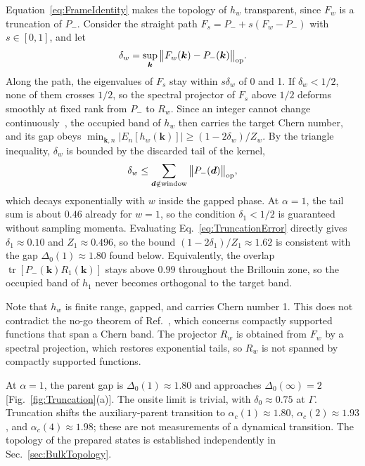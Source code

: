\documentclass[aps,prb,10pt,twocolumn,superscriptaddress,longbibliography,floatfix]{revtex4-2}
\newcommand{\bk}{\boldsymbol k}
\newcommand{\newtext}[1]{{\color{blue}#1}}
\begin{document}
{Equation~\eqref{eq:FrameIdentity} makes the topology of $h_w$ transparent, since $F_w$ is a truncation of $P_-$. Consider the straight path $F_s=P_-+s(F_w-P_-)$ with $s\in[0,1]$, and let
\begin{equation}
    \delta_w=\sup_{\bk}\big\|F_w(\bk)-P_-(\bk)\big\|_{\rm op}.
    \label{eq:TruncationError}
\end{equation}
Along the path, the eigenvalues of $F_s$ stay within $s\delta_w$ of 0 and 1. If $\delta_w<1/2$, none of them crosses $1/2$, so the spectral projector of $F_s$ above $1/2$ deforms smoothly at fixed rank from $P_-$ to $R_w$. Since an integer cannot change continuously~\cite{AvronSeilerSimon1983}, the occupied band of $h_w$ then carries the target Chern number, and its gap obeys $\min_{\bk,n}|E_n[h_w(\bk)]|\geq(1-2\delta_w)/Z_w$. By the triangle inequality, $\delta_w$ is bounded by the discarded tail of the kernel,
\begin{equation}
    \delta_w\leq\sum_{\boldsymbol d\notin\text{window}}\big\|P_-(\boldsymbol d)\big\|_{\rm op},
    \label{eq:TailBound}
\end{equation}
which decays exponentially with $w$ inside the gapped phase. At $\alpha=1$, the tail sum is about $0.46$ already for $w=1$, so the condition $\delta_1<1/2$ is guaranteed without sampling momenta. Evaluating Eq.~\eqref{eq:TruncationError} directly gives $\delta_1\approx0.10$ and $Z_1\approx0.496$, so the bound $(1-2\delta_1)/Z_1\approx1.62$ is consistent with the gap $\Delta_0(1)\approx1.80$ found below. Equivalently, the overlap $\operatorname{tr}[P_-(\bk)R_1(\bk)]$ stays above $0.99$ throughout the Brillouin zone, so the occupied band of $h_1$ never becomes orthogonal to the target band.

Note that $h_w$ is finite range, gapped, and carries Chern number 1. This does not contradict the no-go theorem of Ref.~\cite{DubailRead2015}, which concerns compactly supported functions that span a Chern band. The projector $R_w$ is obtained from $F_w$ by a spectral projection, which restores exponential tails, so $R_w$ is not spanned by compactly supported functions.
}

\newtext{At $\alpha=1$, the parent gap is $\Delta_0(1)\approx1.80$ and approaches $\Delta_0(\infty)=2$ [Fig.~\ref{fig:Truncation}(a)]. The onsite limit is trivial, with $\delta_0\approx0.75$ at $\Gamma$. Truncation shifts the auxiliary-parent transition to $\alpha_c(1)\approx1.80$, $\alpha_c(2)\approx1.93$, and $\alpha_c(4)\approx1.98$; these are not measurements of a dynamical transition. The topology of the prepared states is established independently in Sec.~\ref{sec:BulkTopology}.}
\end{document}
